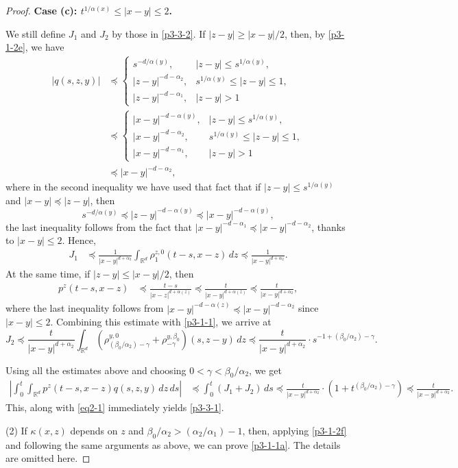 \documentclass[a4paper,11pt]{amsart}
\renewcommand{\le}{\leqslant}
\renewcommand{\ge}{\geqslant}
\newcommand{\R}{\mathds R}
\newcommand{\B}{\beta}
\newcommand{\p}{\preceq}
\newcommand{\K}{\kappa}
\newcommand{\A}{\alpha}
\newcommand{\G}{\gamma}
\theoremstyle{definition}
\begin{document}
\begin{proof}
{\bf Case (c): $t^{{1}/ \A(x)}\le |x-y|\le 2$.}

We still define $J_1$ and $J_2$ by those in \eqref{p3-3-2}.
If $|z-y|\ge {|x-y|}/{2}$,
then, by  \eqref{p3-1-2e}, we have
\begin{align*}
|q(s,z,y)|&\p
\begin{cases}
s^{-d/\A(y)},& |z-y|\le s^{1/\A(y)},\\
|z-y|^{-d-\A_2},& s^{{1}/{\A(y)}}\le|z-y|\le 1,\\
 |z-y|^{-d-\A_1},& |z-y|>1
\end{cases}
\\
&\p
\begin{cases}
|x-y|^{-d-\A(y)},& |z-y|\le s^{{1}/{\A(y)}},\\
|x-y|^{-d-\A_2},& s^{{1}/{\A(y)}}\le|z-y|\le 1,\\
|x-y|^{-d-\A_1},& |z-y|>1
\end{cases}
\\
&\p |x-y|^{-d-\A_2},
\end{align*}
where in the second inequality we have used that fact that if
$|z-y|\le s^{1/\A(y)}$ and $|x-y|\p |z-y|$, then
$$s^{-d/\A(y)}\p |z-y|^{-d-\A(y)}\p |x-y|^{-d-\A(y)},$$
the last inequality follows from the fact that $|x-y|^{-d-\A_1}\p |x-y|^{-d-\A_2}$, thanks to $|x-y|\le 2$.
Hence,
\begin{align*}
J_1&\p \frac{1}{|x-y|^{d+\A_2}} \int_{\R^d}\rho^{z,0}_1(t-s,x-z)\,dz \p \frac{1}{|x-y|^{d+\A_2}}.
\end{align*}
At the same time, if $|z-y|\le {|x-y|}/{2}$, then
\begin{align*}
p^z(t-s,x-z)&\p \frac{t-s}{|x-z|^{d+\A(z)}}\p \frac{t}{|x-y|^{d+\A(z)}}\p \frac{t}{|x-y|^{d+\A_2}},
\end{align*}
where the last inequality follows from $|x-y|^{-d-\A(z)}\p |x-y|^{-d-\A_2}$ since $|x-y|\le 2$.
Combining this estimate with \eqref{p3-1-1},  we arrive at
$$
J_2 \p \frac{t}{|x-y|^{d+\A_2}}\int_{\R^d}\left(
\rho^{y,0}_{({\B_0}/{\A_2})-\G}+\rho^{y,\B_0}_{-\G}\right)(s,z-y)\,dz \p \frac{t}{|x-y|^{d+\A_2}}\cdot s^{-1+(\B_0/{\A_2})-\G}.
$$

Using all the estimates above and choosing $0<\G<{\B_0}/{\A_2}$, we get
\begin{align*}
 \left|\int_0^t \int_{\R^d}p^z(t-s,x-z)q(s,z,y)\,dz\,ds\right|
&\p \int_0^t (J_1+J_2)\,ds\p \frac{t}{|x-y|^{d+\A_2}}\cdot \left(1+t^{({\B_0}/{\A_2})-\G}\right)\!\p \frac{t}{|x-y|^{d+\A_2}}.
\end{align*}
This, along with \eqref{eq2-1} immediately yields \eqref{p3-3-1}.






(2) If $\K(x,z)$ depends on $z$ and ${\B_0}/{\A_2}>({\A_2}/{\A_1})-1$, then, applying \eqref{p3-1-2f} and following the same arguments as above, we can prove
\eqref{p3-1-1a}. The details are omitted here.
\end{proof}
\end{document}

